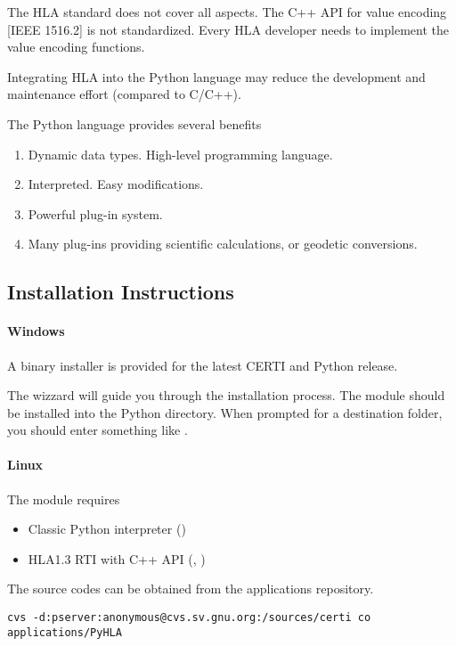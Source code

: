 \documentclass[12pt,a4paper]{howto}
\begin{document}
The HLA standard does not cover all aspects.
The C++ API for value encoding [IEEE 1516.2] is not standardized. Every HLA
developer needs to implement the value encoding functions.

Integrating HLA into the Python language may reduce the development and
maintenance effort (compared to C/C++).

The Python language provides several benefits
\begin{enumerate}
\item Dynamic data types. High-level programming language.
\item Interpreted. Easy modifications.
\item Powerful plug-in system.
\item Many plug-ins providing scientific calculations, or geodetic conversions.
\end{enumerate}

\subsection{Installation Instructions}

\paragraph{Windows}

A binary installer is provided for the latest CERTI and Python release.

The wizzard will guide you through the installation process. The 
module should be installed into the Python  directory.
When prompted for a destination folder, you should enter something like
.

\paragraph{Linux}

The  module requires
\begin{itemize}
\item Classic Python interpreter ()
\item HLA1.3 RTI with C++ API (, )
\end{itemize}

The  source codes can be obtained from the 
applications repository.
\begin{verbatim}
cvs -d:pserver:anonymous@cvs.sv.gnu.org:/sources/certi co applications/PyHLA
\end{verbatim}
\end{document}
